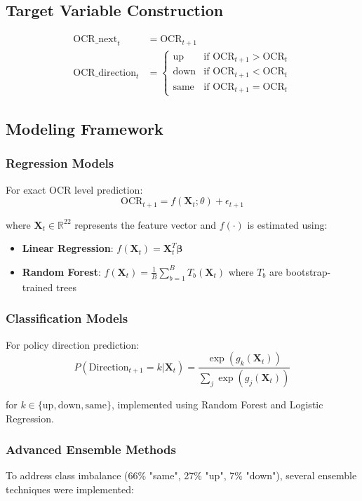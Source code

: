 \documentclass[11pt,a4paper]{article}
\begin{document}
	\subsection{Target Variable Construction}
	\begin{align}
		\text{OCR\_next}_t &= \text{OCR}_{t+1} \\
		\text{OCR\_direction}_t &= \begin{cases}
			\text{up} & \text{if } \text{OCR}_{t+1} > \text{OCR}_t \\
			\text{down} & \text{if } \text{OCR}_{t+1} < \text{OCR}_t \\
			\text{same} & \text{if } \text{OCR}_{t+1} = \text{OCR}_t
		\end{cases}
	\end{align}
	
	\subsection{Modeling Framework}
	
	\subsubsection{Regression Models}
	For exact OCR level prediction:
	$$\text{OCR}_{t+1} = f(\mathbf{X}_t; \theta) + \epsilon_{t+1}$$
	
	where $\mathbf{X}_t \in \mathbb{R}^{22}$ represents the feature vector and $f(\cdot)$ is estimated using:
	\begin{itemize}
		\item \textbf{Linear Regression}: $f(\mathbf{X}_t) = \mathbf{X}_t^T \boldsymbol{\beta}$
		\item \textbf{Random Forest}: $f(\mathbf{X}_t) = \frac{1}{B}\sum_{b=1}^{B} T_b(\mathbf{X}_t)$ where $T_b$ are bootstrap-trained trees
	\end{itemize}
	
	\subsubsection{Classification Models}
	For policy direction prediction:
	$$P(\text{Direction}_{t+1} = k | \mathbf{X}_t) = \frac{\exp(g_k(\mathbf{X}_t))}{\sum_{j} \exp(g_j(\mathbf{X}_t))}$$
	
	for $k \in \{\text{up}, \text{down}, \text{same}\}$, implemented using Random Forest and Logistic Regression.
	
	\subsubsection{Advanced Ensemble Methods}
	To address class imbalance (66\% "same", 27\% "up", 7\% "down"), several ensemble techniques were implemented:
	
\end{document}
